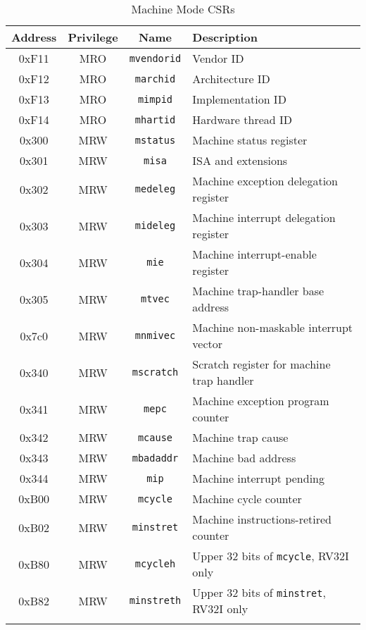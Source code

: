 \begin{longtable}[]{@{}cccl@{}}
	\toprule
	\textbf{Address} & \textbf{Privilege} & \textbf{Name} & \textbf{Description}\tabularnewline
	\midrule

	\endhead



	0xF11 & MRO & \texttt{mvendorid} & Vendor ID\tabularnewline
	0xF12 & MRO & \texttt{marchid}   & Architecture ID\tabularnewline
	0xF13 & MRO & \texttt{mimpid}    & Implementation ID\tabularnewline
	0xF14 & MRO & \texttt{mhartid}   & Hardware thread ID\tabularnewline



	0x300 & MRW & \texttt{mstatus} & Machine status register\tabularnewline
	0x301 & MRW & \texttt{misa}    & ISA and extensions\tabularnewline
	0x302 & MRW & \texttt{medeleg} & Machine exception delegation register\tabularnewline
	0x303 & MRW & \texttt{mideleg} & Machine interrupt delegation register\tabularnewline
	0x304 & MRW & \texttt{mie}     & Machine interrupt-enable register\tabularnewline
	0x305 & MRW & \texttt{mtvec}   & Machine trap-handler base address\tabularnewline
	0x7c0 & MRW & \texttt{mnmivec} & Machine non-maskable interrupt vector\tabularnewline



	0x340 & MRW & \texttt{mscratch} & Scratch register for machine trap handler\tabularnewline
	0x341 & MRW & \texttt{mepc}     & Machine exception program counter\tabularnewline
	0x342 & MRW & \texttt{mcause}   & Machine trap cause\tabularnewline
	0x343 & MRW & \texttt{mbadaddr} & Machine bad address\tabularnewline
	0x344 & MRW & \texttt{mip}      & Machine interrupt pending\tabularnewline



	0xB00 & MRW & \texttt{mcycle}    & Machine cycle counter\tabularnewline
	0xB02 & MRW & \texttt{minstret}  & Machine instructions-retired counter\tabularnewline
	0xB80 & MRW & \texttt{mcycleh}   & Upper 32 bits of \texttt{mcycle}, RV32I only\tabularnewline
	0xB82 & MRW & \texttt{minstreth} & Upper 32 bits of \texttt{minstret}, RV32I only\tabularnewline
\bottomrule
\caption{Machine Mode CSRs}
\label{tab:machine-csrs}
\end{longtable}














